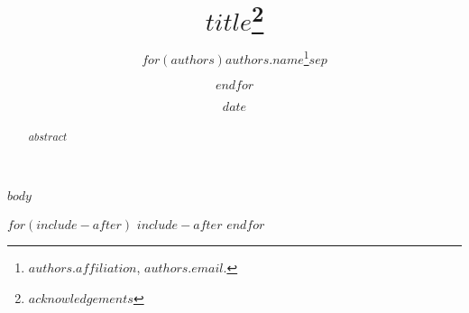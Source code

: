 \documentclass[a4paper, 1]{article}
\date{$date$}
\title{\LARGE{$title$}\thanks{$acknowledgements$}}
\author{\onehalfspacing
  $for(authors)$$authors.name$\thanks{$authors.affiliation$, $authors.email$.}$sep$ \and $endfor$
}
\begin{document}
\maketitle

\begin{abstract}
\noindent $abstract$
\end{abstract}

\clearpage
{}

$body$

$for(include-after)$
$include-after$
$endfor$
\end{document}

